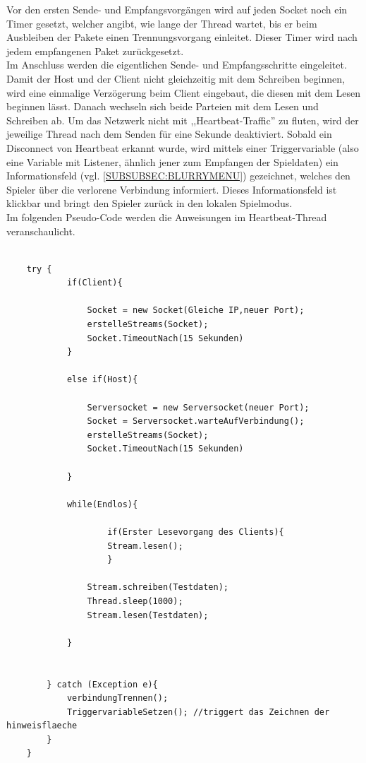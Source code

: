 \documentclass[12pt,a4paper]{article}
\begin{document}
Vor den ersten Sende- und Empfangsvorgängen wird auf jeden Socket noch ein Timer gesetzt, welcher angibt, wie lange der Thread wartet, bis er beim Ausbleiben der Pakete einen Trennungsvorgang einleitet. Dieser Timer wird nach jedem empfangenen Paket zurückgesetzt.\\
Im Anschluss werden die eigentlichen Sende- und Empfangsschritte eingeleitet. Damit der Host und der Client nicht gleichzeitig mit dem Schreiben beginnen, wird eine einmalige Verzögerung beim Client eingebaut, die diesen mit dem Lesen beginnen lässt. Danach wechseln sich beide Parteien mit dem Lesen und Schreiben ab. Um das Netzwerk nicht mit ,,Heartbeat-Traffic'' zu fluten, wird der jeweilige Thread nach dem Senden für eine Sekunde deaktiviert. Sobald ein Disconnect von Heartbeat erkannt wurde, wird mittels einer Triggervariable (also eine Variable mit Listener, ähnlich jener zum Empfangen der Spieldaten) ein Informationsfeld (vgl. \ref{SUBSUBSEC:BLURRYMENU}) gezeichnet, welches den Spieler über die verlorene Verbindung informiert. Dieses Informationsfeld ist klickbar und bringt den Spieler zurück in den lokalen Spielmodus.\\[2ex]
Im folgenden Pseudo-Code werden die Anweisungen im Heartbeat-Thread veranschaulicht.

\lstset{language=java}
\begin{lstlisting}

	try {
			if(Client){
	
				Socket = new Socket(Gleiche IP,neuer Port);
				erstelleStreams(Socket);
				Socket.TimeoutNach(15 Sekunden)
			}

			else if(Host){

				Serversocket = new Serversocket(neuer Port);
				Socket = Serversocket.warteAufVerbindung();
				erstelleStreams(Socket);
				Socket.TimeoutNach(15 Sekunden)

			}
			
			while(Endlos){

					if(Erster Lesevorgang des Clients){					
					Stream.lesen();
					}

				Stream.schreiben(Testdaten);
				Thread.sleep(1000);
				Stream.lesen(Testdaten);

			}


		} catch (Exception e){
			verbindungTrennen();
			TriggervariableSetzen(); //triggert das Zeichnen der hinweisflaeche
		}
	}
\end{lstlisting}




\newpage
\end{document}
